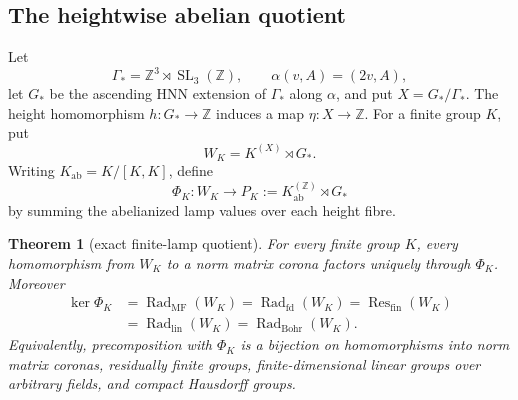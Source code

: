 \documentclass[11pt]{amsart}
\newtheorem{theorem}{Theorem}[section]
\theoremstyle{definition}
\theoremstyle{remark}
\theoremstyle{plain}
\newcommand{\SL}{\operatorname{SL}}
\begin{document}
\subsection{The heightwise abelian quotient}

Let
\[
 \Gamma_* = \mathbb Z^3\rtimes\SL_3(\mathbb Z),
 \qquad \alpha(v,A)=(2v,A),
\]
let $G_*$ be the ascending HNN extension of $\Gamma_*$ along $\alpha$, and
put $X=G_*/\Gamma_*$.  The height homomorphism $h\colon G_*\to\mathbb Z$
induces a map $\eta\colon X\to\mathbb Z$.  For a finite group $K$, put
\[
 W_K=K^{(X)}\rtimes G_*.
\]
Writing $K_{\mathrm{ab}}=K/[K,K]$, define
\[
 \Phi_K\colon W_K\longrightarrow
 P_K:=K_{\mathrm{ab}}^{(\mathbb Z)}\rtimes G_*
\]
by summing the abelianized lamp values over each height fibre.

\begin{theorem}[exact finite-lamp quotient]
\label{thm:notes-visible-quotient}
For every finite group $K$, every homomorphism from $W_K$ to a norm matrix
corona factors uniquely through $\Phi_K$.  Moreover
\[
 \begin{aligned}
 \ker\Phi_K
 &=\operatorname{Rad}_{\mathrm{MF}}(W_K)
  =\operatorname{Rad}_{\mathrm{fd}}(W_K)
  =\operatorname{Res}_{\mathrm{fin}}(W_K)\\
 &=\operatorname{Rad}_{\mathrm{lin}}(W_K)
  =\operatorname{Rad}_{\mathrm{Bohr}}(W_K).
 \end{aligned}
\]
Equivalently, precomposition with $\Phi_K$ is a bijection on homomorphisms
into norm matrix coronas, residually finite groups, finite-dimensional linear
groups over arbitrary fields, and compact Hausdorff groups.
\end{theorem}
\end{document}
